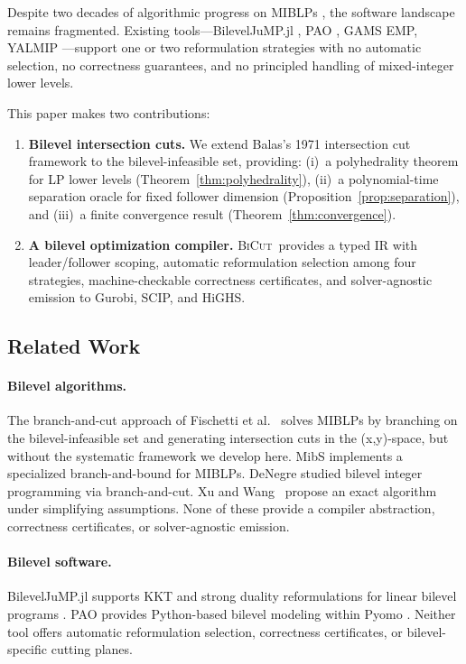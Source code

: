 \documentclass[11pt]{article}
\newcommand{\BiCut}{\textsc{BiCut}}
\begin{document}
Despite two decades of algorithmic progress on MIBLPs
\cite{dempe2002foundations, colson2007overview}, the software landscape
remains fragmented. Existing tools---BilevelJuMP.jl \cite{diasgarcia2022bilevel},
PAO \cite{hart2017pyomo}, GAMS EMP, YALMIP \cite{lofberg2004yalmip}---support
one or two reformulation strategies with no automatic selection, no correctness
guarantees, and no principled handling of mixed-integer lower levels.

This paper makes two contributions:

\begin{enumerate}
\item \textbf{Bilevel intersection cuts.} We extend Balas's 1971 intersection
  cut framework \cite{balas1971intersection} to the bilevel-infeasible set,
  providing: (i)~a polyhedrality theorem for LP lower levels (Theorem~\ref{thm:polyhedrality}),
  (ii)~a polynomial-time separation oracle for fixed follower dimension
  (Proposition~\ref{prop:separation}), and (iii)~a finite convergence result
  (Theorem~\ref{thm:convergence}).

\item \textbf{A bilevel optimization compiler.} \BiCut\ provides a typed IR
  with leader/follower scoping, automatic reformulation selection among four
  strategies, machine-checkable correctness certificates, and solver-agnostic
  emission to Gurobi, SCIP, and HiGHS.
\end{enumerate}

\subsection{Related Work}

\paragraph{Bilevel algorithms.}
The branch-and-cut approach of Fischetti et al.~\cite{fischetti2017new}
solves MIBLPs by branching on the bilevel-infeasible set and generating
intersection cuts in the (x,y)-space, but without the systematic framework
we develop here. MibS \cite{tahernejad2020branch} implements
a specialized branch-and-bound for MIBLPs. DeNegre \cite{denegre2011phd}
studied bilevel integer programming via branch-and-cut. Xu and
Wang~\cite{xu2014exact} propose an exact algorithm under simplifying
assumptions. None of these provide a compiler abstraction, correctness
certificates, or solver-agnostic emission.

\paragraph{Bilevel software.}
BilevelJuMP.jl supports KKT and strong duality reformulations for linear
bilevel programs \cite{diasgarcia2022bilevel}. PAO provides Python-based
bilevel modeling within Pyomo \cite{hart2017pyomo}. Neither tool offers
automatic reformulation selection, correctness certificates, or
bilevel-specific cutting planes.
\end{document}
